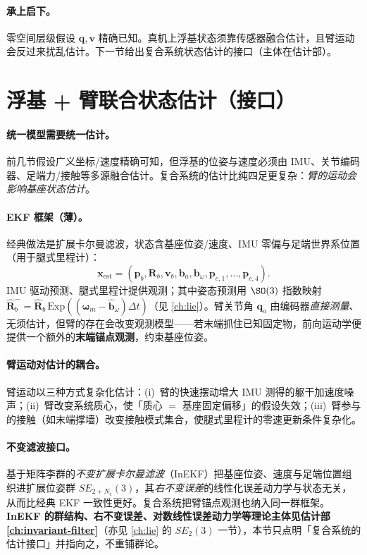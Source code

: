 \paragraph{承上启下。}
零空间层级假设 $\mathbf q,\mathbf v$ 精确已知。真机上浮基状态须靠传感器融合估计，且臂运动会反过来扰乱估计。下一节给出复合系统状态估计的接口（主体在估计部）。

\section{浮基 + 臂联合状态估计（接口）}
\label{sec:umm-estimation}

\paragraph{统一模型需要统一估计。}
前几节假设广义坐标/速度精确可知，但浮基的位姿与速度必须由 IMU、关节编码器、足端力/接触等多源融合估计。复合系统的估计比纯四足更复杂：\emph{臂的运动会影响基座状态估计}。

\paragraph{EKF 框架（薄）。}
经典做法是扩展卡尔曼滤波，状态含基座位姿/速度、IMU 零偏与足端世界系位置（用于腿式里程计）：
\begin{equation}
  \mathbf x_{\text{est}}=(\mathbf p_b,\mathbf R_b,\mathbf v_b,\mathbf b_a,\mathbf b_\omega,\mathbf p_{c,1},\dots,\mathbf p_{c,4}).
  \label{eq:umm-ekf-state}
\end{equation}
IMU 驱动预测、腿式里程计提供观测；其中姿态预测用 $\SO(3)$ 指数映射 $\hat{\mathbf R}_b^{-}=\hat{\mathbf R}_b\,\mathrm{Exp}((\boldsymbol\omega_m-\hat{\mathbf b}_\omega)\Delta t)$（见 \cref{ch:lie}）。臂关节角 $\mathbf q_a$ 由编码器\emph{直接测量}、无须估计，但臂的存在会改变观测模型——若末端抓住已知固定物，前向运动学便提供一个额外的\textbf{末端锚点观测}，约束基座位姿。

\paragraph{臂运动对估计的耦合。}
臂运动以三种方式复杂化估计：(i)~臂的快速摆动增大 IMU 测得的躯干加速度噪声；(ii)~臂改变系统质心，使「质心 $=$ 基座固定偏移」的假设失效；(iii)~臂参与的接触（如末端撑墙）改变接触模式集合，使腿式里程计的零速更新条件复杂化。

\paragraph{不变滤波接口。}
基于矩阵李群的\emph{不变扩展卡尔曼滤波}（InEKF）把基座位姿、速度与足端位置组织进扩展位姿群 $SE_{2+N_c}(3)$，其\emph{右不变误差}的线性化误差动力学与状态无关，从而比经典 EKF 一致性更好。复合系统把臂锚点观测也纳入同一群框架。\textbf{InEKF 的群结构、右不变误差、对数线性误差动力学等理论主体见估计部 \cref{ch:invariant-filter}}（亦见 \cref{ch:lie} 的 $SE_2(3)$ 一节），本节只点明「复合系统的估计接口」并指向之，不重铺群论。

